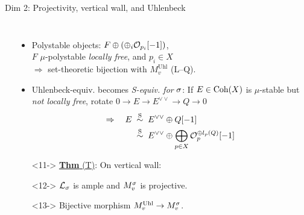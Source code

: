 \documentclass[8pt,handout]{beamer} %
\begin{document}
\begin{frame}[fragile]{Dim 2: Projectivity, vertical wall, and Uhlenbeck}
\begin{columns}[t]
\begin{itemize}
\begin{center}
        \end{center}
        \end{itemize}
                
        \begin{itemize}
            \item<9-> Polystable objects: $F \oplus (\oplus_i \mathcal{O}_{p_i}[-1])$, \\ $F$ $\mu$-polystable \textit{locally free}, and $p_i \in X$ \\ $\Rightarrow$ set-theoretic bijection with $M^{\text{Uhl}}_v$ (L--Q).
            \item<10-> Uhlenbeck-equiv. becomes \textit{S-equiv. for} $\sigma$: If $E \in \mathrm{Coh}(X)$ is $\mu$-stable but \textit{not locally free}, rotate $0 \to E \to E^{\vee\vee} \to Q \to 0$
            \begin{align*}
                \Rightarrow \quad E \; & \overset{\text{S}}{\sim} \; E^{\vee\vee} \oplus Q[-1] \\
                & \overset{\text{S}}{\sim} \; E^{\vee\vee} \oplus \bigoplus_{p \in X} \mathcal{O}_p^{\oplus l_p(Q)}[-1]
            \end{align*} 
            \item[]<11-> \underline{\textbf{Thm} (T)}: On vertical wall:
                \item[]<12-> $\mathcal{L}_\sigma$ is ample and $M^\sigma_v$ is projective.
                \item[]<13-> Bijective morphism $M^{\text{Uhl}}_v \to M^\sigma_v$.
            

\end{itemize}
\end{columns}
\end{frame}
\end{document}
